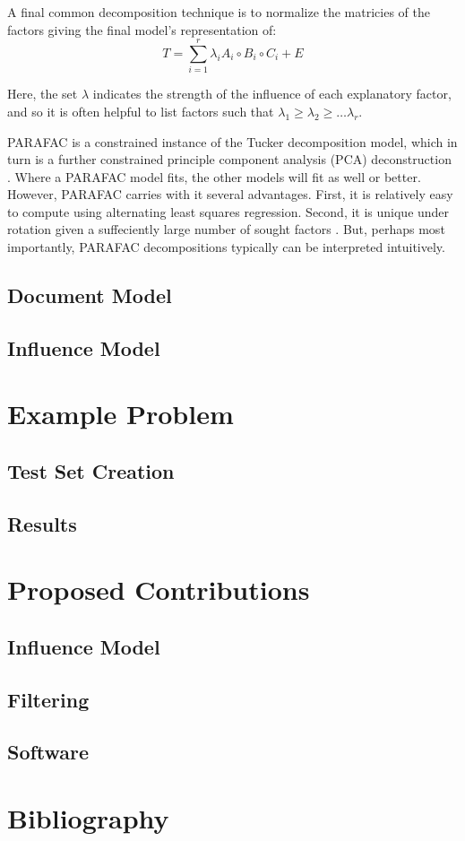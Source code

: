 \documentclass{article}
\begin{document}
A final common decomposition technique is to normalize the matricies
of the factors giving the final model's representation of:
\begin{equation}
    \label{eq:parafac-lambda}
    T = \displaystyle\sum_{i=1}^{r} \lambda_i A_i \circ B_i \circ C_i
    + E
\end{equation}

Here, the set $\lambda$ indicates the strength of the influence of
each explanatory factor, and so it is often helpful to list factors
such that $\lambda_1 \geq \lambda_2 \geq \ldots \lambda_r$.

PARAFAC is a constrained instance of the Tucker decomposition model,
which in turn is a further constrained principle component analysis
(PCA) deconstruction \cite{bro1997}.  Where a PARAFAC model fits, the
other models will fit as well or better.  However, PARAFAC carries
with it several advantages.  First, it is relatively easy to compute
using alternating least squares regression.  Second, it is unique
under rotation given a suffeciently large number of sought factors
\cite{harsman1970}.  But, perhaps most importantly, PARAFAC
decompositions typically can be interpreted intuitively.  

\subsection{Document Model}
\subsection{Influence Model}

\section{Example Problem}
\subsection{Test Set Creation}
\subsection{Results}

\section{Proposed Contributions}
\subsection{Influence Model}
\subsection{Filtering}
\subsection{Software}

\section{Bibliography}
{}

\end{document}

